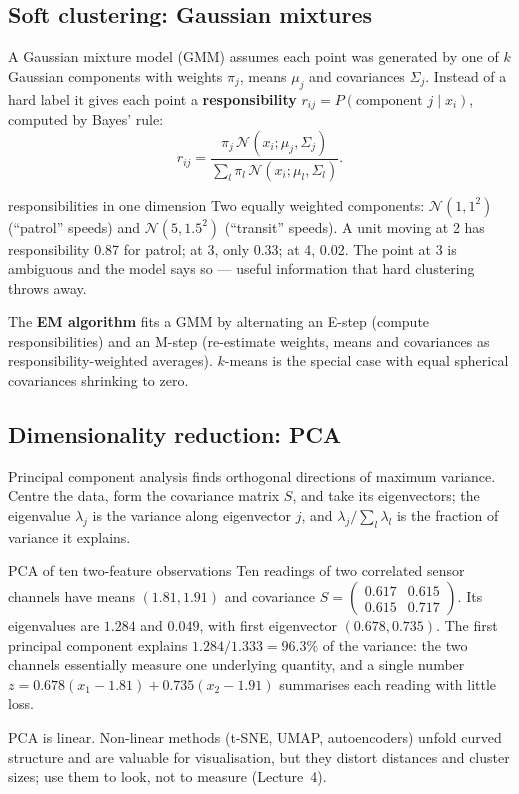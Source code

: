 \documentclass[11pt]{article}
\begin{document}
\subsection{Soft clustering: Gaussian mixtures}
A Gaussian mixture model (GMM) assumes each point was generated by one of $k$ Gaussian components with weights $\pi_j$, means $\mu_j$ and covariances $\Sigma_j$. Instead of a hard label it gives each point a \textbf{responsibility} $r_{ij}=P(\text{component }j\mid x_i)$, computed by Bayes' rule:
\[r_{ij}=\frac{\pi_j\,\mathcal N(x_i;\mu_j,\Sigma_j)}{\sum_l\pi_l\,\mathcal N(x_i;\mu_l,\Sigma_l)}.\]
\begin{example}{responsibilities in one dimension}
Two equally weighted components: $\mathcal N(1,1^2)$ (``patrol'' speeds) and $\mathcal N(5,1.5^2)$ (``transit'' speeds). A unit moving at 2 has responsibility 0.87 for patrol; at 3, only 0.33; at 4, 0.02. The point at 3 is ambiguous and the model says so --- useful information that hard clustering throws away.
\end{example}
The \textbf{EM algorithm} fits a GMM by alternating an E-step (compute responsibilities) and an M-step (re-estimate weights, means and covariances as responsibility-weighted averages). $k$-means is the special case with equal spherical covariances shrinking to zero.

\subsection{Dimensionality reduction: PCA}
Principal component analysis finds orthogonal directions of maximum variance. Centre the data, form the covariance matrix $S$, and take its eigenvectors; the eigenvalue $\lambda_j$ is the variance along eigenvector $j$, and $\lambda_j/\sum_l\lambda_l$ is the fraction of variance it explains.
\begin{example}{PCA of ten two-feature observations}
Ten readings of two correlated sensor channels have means $(1.81,1.91)$ and covariance $S=\begin{pmatrix}0.617&0.615\\0.615&0.717\end{pmatrix}$. Its eigenvalues are $1.284$ and $0.049$, with first eigenvector $(0.678,0.735)$. The first principal component explains $1.284/1.333=96.3\%$ of the variance: the two channels essentially measure one underlying quantity, and a single number $z=0.678(x_1-1.81)+0.735(x_2-1.91)$ summarises each reading with little loss.
\end{example}
PCA is linear. Non-linear methods (t-SNE, UMAP, autoencoders) unfold curved structure and are valuable for visualisation, but they distort distances and cluster sizes; use them to look, not to measure (Lecture~4).
\end{document}
